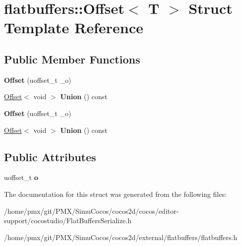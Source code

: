 \hypertarget{structflatbuffers_1_1Offset}{}\section{flatbuffers\+:\+:Offset$<$ T $>$ Struct Template Reference}
\label{structflatbuffers_1_1Offset}
\subsection*{Public Member Functions}
\begin{DoxyCompactItemize}
\item 
\mbox{\label{structflatbuffers_1_1Offset_a67d328892dd0d940950e8128d6bf795b}} 
{\bfseries Offset} (uoffset\+\_\+t \+\_\+o)
\item 
\mbox{\label{structflatbuffers_1_1Offset_acb3e46d417d2c3ee804763bf2eae2109}} 
\hyperlink{structflatbuffers_1_1Offset}{Offset}$<$ void $>$ {\bfseries Union} () const
\item 
\mbox{\label{structflatbuffers_1_1Offset_a67d328892dd0d940950e8128d6bf795b}} 
{\bfseries Offset} (uoffset\+\_\+t \+\_\+o)
\item 
\mbox{\label{structflatbuffers_1_1Offset_acb3e46d417d2c3ee804763bf2eae2109}} 
\hyperlink{structflatbuffers_1_1Offset}{Offset}$<$ void $>$ {\bfseries Union} () const
\end{DoxyCompactItemize}
\subsection*{Public Attributes}
\begin{DoxyCompactItemize}
\item 
\mbox{\label{structflatbuffers_1_1Offset_a69571197b0da57e6484ef8191ac205a7}} 
uoffset\+\_\+t {\bfseries o}
\end{DoxyCompactItemize}


The documentation for this struct was generated from the following files\+:\begin{DoxyCompactItemize}
\item 
/home/pmx/git/\+P\+M\+X/\+Simu\+Cocos/cocos2d/cocos/editor-\/support/cocostudio/Flat\+Buffers\+Serialize.\+h\item 
/home/pmx/git/\+P\+M\+X/\+Simu\+Cocos/cocos2d/external/flatbuffers/flatbuffers.\+h\end{DoxyCompactItemize}
